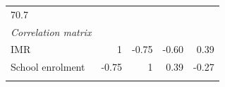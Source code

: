 \documentclass[11pt,a4paper,openany]{book}
\begin{document}
\begin{longtable}[]{@{}lrrrr@{}}
\begin{minipage}[t]{0.08\columnwidth}
70.7\strut
\end{minipage}\tabularnewline
\begin{minipage}[t]{0.41\columnwidth}\raggedright\strut
\emph{Correlation matrix}\strut
\end{minipage} & \begin{minipage}[t]{0.20\columnwidth}\raggedleft\strut
\strut
\end{minipage} & \begin{minipage}[t]{0.07\columnwidth}\raggedleft\strut
\strut
\end{minipage} & \begin{minipage}[t]{0.08\columnwidth}\raggedleft\strut
\strut
\end{minipage} & \begin{minipage}[t]{0.08\columnwidth}\raggedleft\strut
\strut
\end{minipage}\tabularnewline
\begin{minipage}[t]{0.41\columnwidth}\raggedright\strut
IMR\strut
\end{minipage} & \begin{minipage}[t]{0.20\columnwidth}\raggedleft\strut
1\strut
\end{minipage} & \begin{minipage}[t]{0.07\columnwidth}\raggedleft\strut
-0.75\strut
\end{minipage} & \begin{minipage}[t]{0.08\columnwidth}\raggedleft\strut
-0.60\strut
\end{minipage} & \begin{minipage}[t]{0.08\columnwidth}\raggedleft\strut
0.39\strut
\end{minipage}\tabularnewline
\begin{minipage}[t]{0.41\columnwidth}\raggedright\strut
School enrolment\strut
\end{minipage} & \begin{minipage}[t]{0.20\columnwidth}\raggedleft\strut
-0.75\strut
\end{minipage} & \begin{minipage}[t]{0.07\columnwidth}\raggedleft\strut
1\strut
\end{minipage} & \begin{minipage}[t]{0.08\columnwidth}\raggedleft\strut
0.39\strut
\end{minipage} & \begin{minipage}[t]{0.08\columnwidth}\raggedleft\strut
-0.27\strut
\end{minipage}\tabularnewline
\begin{minipage}[t]{0.41\columnwidth}\raggedright\strut

\end{minipage}
\end{longtable}
\end{document}
